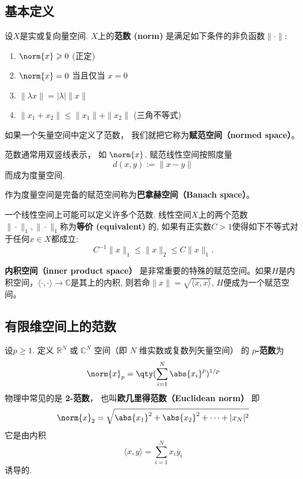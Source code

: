 

\subsection{基本定义}

设$X$是实或复向量空间. $X$上的\textbf{范数 (norm)} 是满足如下条件的非负函数$\|\cdot\|$:
\begin{enumerate}
\item $\norm{x} \geqslant 0$ (正定)
\item $\norm{x} = 0$ 当且仅当 $x = 0$
\item $\|\lambda x\| = |\lambda|\|x\|$
\item $\|x_1+x_2\| \leqslant \|x_1\|+ \|x_2\|$ (三角不等式)
\end{enumerate}
如果一个矢量空间中定义了范数， 我们就把它称为\textbf{赋范空间（normed space）}。

范数通常用双竖线表示， 如 $\norm{x}$. 赋范线性空间按照度量
$$
d(x,y):=\|x-y\|
$$
而成为度量空间. 

作为度量空间是完备的赋范空间称为\textbf{巴拿赫空间（Banach space）}。%

一个线性空间上可能可以定义许多个范数. 线性空间$X$上的两个范数$\|\cdot\|_1,\|\cdot\|_1$称为\textbf{等价 (equivalent)} 的, 如果有正实数$C>1$使得如下不等式对于任何$x\in X$都成立:
$$
C^{-1}\|x\|_{1}\leq\|x\|_2\leq C\|x\|_1.
$$

\textbf{内积空间（inner product space）} 是非常重要的特殊的赋范空间。如果$H$是内积空间，$\langle\cdot,\cdot\rangle\to\mathbb C$是其上的内积, 则若命$\|x\|=\sqrt{\langle x,x\rangle }$, $H$便成为一个赋范空间。

\subsection{有限维空间上的范数}
设$p\geq1$. 定义 $\mathbb R^N$ 或 $\mathbb C^N$ 空间（即 $N$ 维实数或复数列矢量空间） 的 \textbf{$p$-范数}为
\begin{equation}
\norm{ x}_p = \qty(\sum_{i=1}^N \abs{x_i}^p)^{1/p}
\end{equation}
物理中常见的是 \textbf{2-范数}， 也叫\textbf{欧几里得范数（Euclidean norm）} 即
\begin{equation}
\norm{ x}_2 = \sqrt{\abs{x_1}^2 + \abs{x_2}^2 + \dots+|x_N|^2}
\end{equation}
它是由内积
$$
\langle x,y\rangle=\sum_{i=1}^Nx_i\bar y_i
$$
诱导的.

